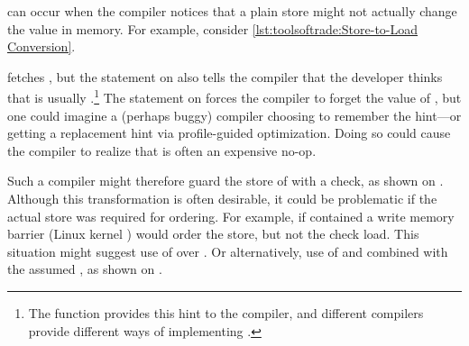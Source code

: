 \begin{description}[labelsep=.4em]
\item[Store-to-load transformations] can occur when the compiler notices
that a plain store might not actually change the value in memory.
For example, consider
\cref{lst:toolsoftrade:Store-to-Load Conversion}.
\begin{fcvref}
 fetches , but the  statement on
 also tells the compiler that the developer thinks that
 is usually .\footnote{
	The  function provides this hint to the compiler,
	and different compilers provide different ways of implementing
	.}
The  statement on  forces the compiler to forget
the value of , but one could imagine a (perhaps buggy) compiler
choosing to remember the hint---or getting a replacement hint via
profile-guided optimization.
Doing so could cause the compiler to realize that  is often an
expensive no-op.

Such a compiler might therefore guard the store of 
with a check, as shown on .
Although this transformation is often desirable, it could be problematic
if the actual store was required for ordering.
For example, if  contained a write memory barrier
(Linux kernel ) would order the store, but not the
check load.
This situation might suggest use of  over
.
Or alternatively, use of  and  combined
with the assumed , as shown on .
\end{fcvref}

\end{description}
